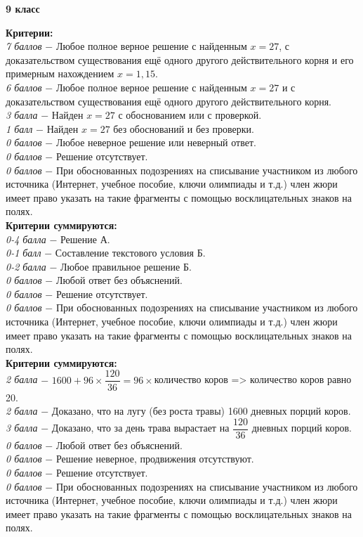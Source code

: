 \centerline{\bf \Huge 9 класс}

 \textbf{Критерии:} \\
\textit{7 баллов} $-$ Любое полное верное решение с найденным $x=27$, с доказательством существования ещё одного другого действительного корня и его примерным нахождением $x=1,15$.\\
\textit{6 баллов} $-$ Любое полное верное решение с найденным $x=27$ и с доказательством существования ещё одного другого действительного корня.\\
\textit{3 балла} $-$ Найден $x=27$ с обоснованием или с проверкой.\\
\textit{1 балл} $-$ Найден $x=27$ без обоснований и без проверки.\\
\textit{0 баллов} $-$ Любое неверное решение или неверный ответ.\\
\textit{0 баллов} $-$ Решение отсутствует.\\
\textit{0 баллов} $-$ При обоснованных подозрениях на списывание участником из любого источника (Интернет, учебное пособие, ключи олимпиады и т.д.) член жюри имеет право указать на такие фрагменты с помощью восклицательных знаков на полях. \\

 \textbf{Критерии суммируются:} \\
\textit{0-4 балла} $-$ Решение А.\\
\textit{0-1 балл} $-$ Составление текстового условия Б.\\
\textit{0-2 балла} $-$ Любое правильное решение Б.\\
\textit{0 баллов} $-$ Любой ответ без объяснений.\\
\textit{0 баллов} $-$ Решение отсутствует.\\
\textit{0 баллов} $-$ При обоснованных подозрениях на списывание участником из любого источника (Интернет, учебное пособие, ключи олимпиады и т.д.) член жюри имеет право указать на такие фрагменты с помощью восклицательных знаков на полях. \\



 \textbf{Критерии суммируются:} \\
\textit{2 балла} $-$ $1600+96\times\dfrac{120}{36}=96\times$количество коров => количество коров равно 20.\\
\textit{2 балла} $-$ Доказано, что на лугу (без роста травы) 1600 дневных порций коров.\\
\textit{3 балла} $-$ Доказано, что за день трава вырастает на $\dfrac{120}{36}$ дневных порций коров.\\
\textit{0 баллов} $-$ Любой ответ без объяснений.\\
\textit{0 баллов} $-$ Решение неверное, продвижения отсутствуют.\\
\textit{0 баллов} $-$ Решение отсутствует.\\
\textit{0 баллов} $-$ При обоснованных подозрениях на списывание участником из любого источника (Интернет, учебное пособие, ключи олимпиады и т.д.) член жюри имеет право указать на такие фрагменты с помощью восклицательных знаков на полях. \\

